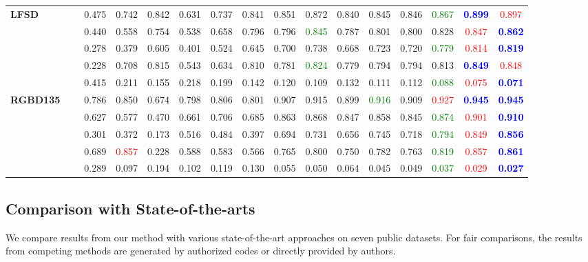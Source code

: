 \documentclass[runningheads]{llncs}
\begin{document}
\begin{table*}[tp]
{\begin{tabular}{lllccccccccccccc}
	\multirow{5}{*}{\textbf{LFSD}~\cite{LFS2017}}
&		&0.475	&0.742	&0.842	&0.631	&0.737	&0.841	&0.851	&0.872	&0.840	&0.845	&0.846	&\textcolor{green}{0.867}	&\textbf{\textcolor{blue}{0.899}}	&\textcolor{red}{0.897}\\
&	&0.440	&0.558	&0.754	&0.538	&0.658	&0.796	&0.796	&\textcolor{green}{0.845}	&0.787	&0.801	&0.800	&0.828	&\textcolor{red}{0.847}	&\textbf{\textcolor{blue}{0.862}}\\
&			&0.278	&0.379	&0.605	&0.401	&0.524	&0.645	&0.700	&0.738	&0.668	&0.723	&0.720	&\textcolor{green}{0.779}	&\textcolor{red}{0.814}	&\textbf{\textcolor{blue}{0.819}}\\
&	&0.228	&0.708	&0.815	&0.543	&0.634	&0.810	&0.781	&\textcolor{green}{0.824}	&0.779	&0.794	&0.794	&0.813	&\textbf{\textcolor{blue}{0.849}}	&\textcolor{red}{0.848}\\
&			&0.415	&0.211	&0.155	&0.218	&0.199	&0.142	&0.120	&0.109	&0.132	&0.111	&0.112	&\textcolor{green}{0.088}	&\textcolor{red}{0.075}	&\textbf{\textcolor{blue}{0.071}}\\
									\cmidrule(r){1-16}
	\multirow{5}{*}{\textbf{RGBD135}~\cite{3DDES}}
&		&0.786	&0.850	&0.674	&0.798	&0.806	&0.801	&0.907	&0.915	&0.899	&\textcolor{green}{0.916}	&0.909	&\textcolor{red}{0.927}	&\textbf{\textcolor{blue}{0.945}}	&\textbf{\textcolor{blue}{0.945}}\\
&	&0.627	&0.577	&0.470	&0.661	&0.706	&0.685	&0.863	&0.868	&0.847	&0.858	&0.845	&\textcolor{green}{0.874}	&\textcolor{red}{0.901}	&\textbf{\textcolor{blue}{0.910}}\\
&			&0.301	&0.372	&0.173	&0.516	&0.484	&0.397	&0.694	&0.731	&0.656	&0.745	&0.718	&\textcolor{green}{0.794}	&\textcolor{red}{0.849}	&\textbf{\textcolor{blue}{0.856}}\\
&	&0.689	&\textcolor{red}{0.857}	&0.228	&0.588	&0.583	&0.566	&0.765	&0.800	&0.750	&0.782	&0.763	&\textcolor{green}{0.819}	&\textcolor{red}{0.857}	&\textbf{\textcolor{blue}{0.861}}\\
&		&0.289	&0.097	&0.194	&0.102	&0.119	&0.130	&0.055	&0.050	&0.064	&0.045	&0.049	&\textcolor{green}{0.037}	&\textcolor{red}{0.029}	&\textbf{\textcolor{blue}{0.027}}\\
									\bottomrule
	\end{tabular}}


	\label{tab:comparison3D}
		\vspace{-0.5cm}
\end{table*}




\subsection{Comparison with State-of-the-arts}
\label{subsection:comparison}
We compare results from our method with various state-of-the-art approaches on seven public datasets.
For fair comparisons, the results from competing methods are generated by authorized codes or directly provided by authors.
\end{document}
